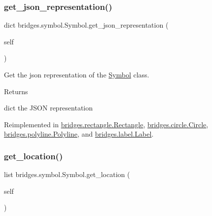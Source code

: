 \mbox{\label{classbridges_1_1symbol_1_1_symbol_a891a710ff160439aa6dc476ce057f22e}} 
\subsubsection{\texorpdfstring{get\_json\_representation()}{get\_json\_representation()}}
{\footnotesize\ttfamily  dict bridges.\+symbol.\+Symbol.\+get\+\_\+json\+\_\+representation (\begin{DoxyParamCaption}\item[{}]{self }\end{DoxyParamCaption})}



Get the json representation of the \mbox{\hyperlink{classbridges_1_1symbol_1_1_symbol}{Symbol}} class. 

\begin{DoxyReturn}{Returns}


dict the J\+S\+ON representation 
\end{DoxyReturn}


Reimplemented in \mbox{\hyperlink{classbridges_1_1rectangle_1_1_rectangle_a5ead80ed6cd7d287e3884e8792b51b40}{bridges.\+rectangle.\+Rectangle}}, \mbox{\hyperlink{classbridges_1_1circle_1_1_circle_ad694ef551d1d26078bddbecaed711ca1}{bridges.\+circle.\+Circle}}, \mbox{\hyperlink{classbridges_1_1polyline_1_1_polyline_a7f99e9e20c90068713b54ad64df3f193}{bridges.\+polyline.\+Polyline}}, and \mbox{\hyperlink{classbridges_1_1label_1_1_label_a71d085a24859764dbe5cf4848f74baef}{bridges.\+label.\+Label}}.

\mbox{\label{classbridges_1_1symbol_1_1_symbol_ab7bf7c5d243838d4f018fae10fe88259}} 
\subsubsection{\texorpdfstring{get\_location()}{get\_location()}}
{\footnotesize\ttfamily  list bridges.\+symbol.\+Symbol.\+get\+\_\+location (\begin{DoxyParamCaption}\item[{}]{self }\end{DoxyParamCaption})}



